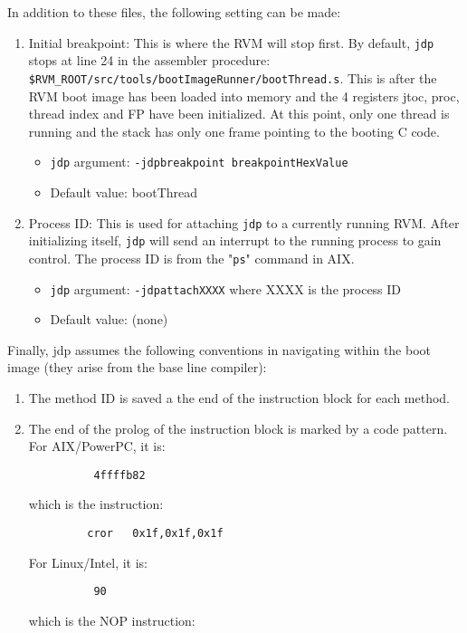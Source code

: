 In addition to these files, the following setting can be made:

\begin{enumerate}
\item Initial breakpoint:  
   This is where the RVM will stop first.  By default, {\tt jdp}
   stops at line 24 in the assembler procedure:
        {\tt \$RVM\_ROOT/src/tools/bootImageRunner/bootThread.s}.
   This is after the RVM boot image has been loaded into memory and
   the 4 registers jtoc, proc, thread index and FP have been initialized.
   At this point, only one thread is running and the stack has only 
   one frame pointing to the booting C code.
\begin{itemize}
\item   {\tt jdp} argument:     {\tt -jdpbreakpoint breakpointHexValue}
\item    Default value:         bootThread
\end{itemize}

\item Process ID:
   This is used for attaching {\tt jdp} to a currently running RVM.  After 
   initializing itself, {\tt jdp} will send an interrupt to the running process 
   to gain control.  The process ID is from the "{\tt ps}" command in AIX.
\begin{itemize}
\item   {\tt jdp} argument:     {\tt -jdpattachXXXX} where XXXX is the process ID
\item    Default value:         (none)
\end{itemize}
\end{enumerate}


Finally, jdp assumes the following conventions in navigating within the 
boot image (they arise from the base line compiler):

\begin{enumerate}
\item The method ID is saved a the end of the instruction block for each
   method.

\item The end of the prolog of the instruction block is marked by a code pattern.
For AIX/PowerPC, it is:
\begin{verbatim}
          4ffffb82      
\end{verbatim}
   which is the instruction:

\begin{verbatim}
         cror   0x1f,0x1f,0x1f
\end{verbatim}
For Linux/Intel, it is:
\begin{verbatim}
          90
\end{verbatim}
   which is the NOP instruction:
\end{enumerate}


